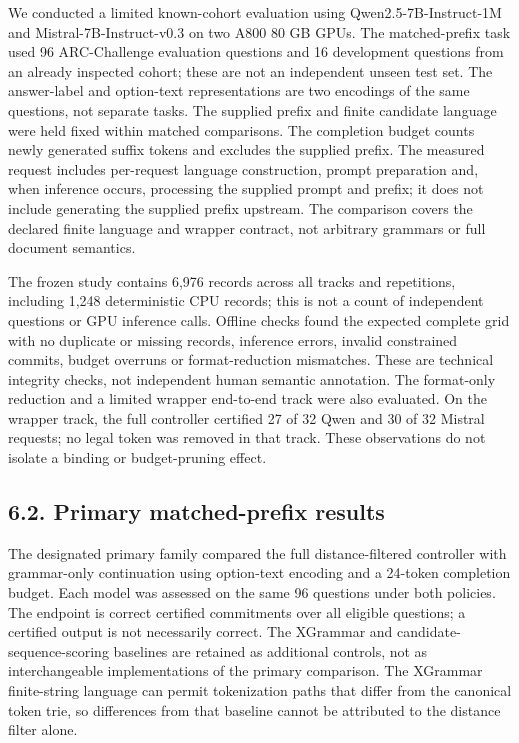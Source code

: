 \documentclass[
  12pt,
  a4paper,
]{article}
\begin{document}
We conducted a limited known-cohort evaluation using Qwen2.5-7B-Instruct-1M and Mistral-7B-Instruct-v0.3 on two A800 80 GB GPUs. The matched-prefix task used 96 ARC-Challenge evaluation questions and 16 development questions from an already inspected cohort; these are not an independent unseen test set. The answer-label and option-text representations are two encodings of the same questions, not separate tasks. The supplied prefix and finite candidate language were held fixed within matched comparisons. The completion budget counts newly generated suffix tokens and excludes the supplied prefix. The measured request includes per-request language construction, prompt preparation and, when inference occurs, processing the supplied prompt and prefix; it does not include generating the supplied prefix upstream. The comparison covers the declared finite language and wrapper contract, not arbitrary grammars or full document semantics.

The frozen study contains 6,976 records across all tracks and repetitions, including 1,248 deterministic CPU records; this is not a count of independent questions or GPU inference calls. Offline checks found the expected complete grid with no duplicate or missing records, inference errors, invalid constrained commits, budget overruns or format-reduction mismatches. These are technical integrity checks, not independent human semantic annotation. The format-only reduction and a limited wrapper end-to-end track were also evaluated. On the wrapper track, the full controller certified 27 of 32 Qwen and 30 of 32 Mistral requests; no legal token was removed in that track. These observations do not isolate a binding or budget-pruning effect.

\subsection{6.2. Primary matched-prefix results}

The designated primary family compared the full distance-filtered controller with grammar-only continuation using option-text encoding and a 24-token completion budget. Each model was assessed on the same 96 questions under both policies. The endpoint is correct certified commitments over all eligible questions; a certified output is not necessarily correct. The XGrammar and candidate-sequence-scoring baselines are retained as additional controls, not as interchangeable implementations of the primary comparison. The XGrammar finite-string language can permit tokenization paths that differ from the canonical token trie, so differences from that baseline cannot be attributed to the distance filter alone.
\end{document}

